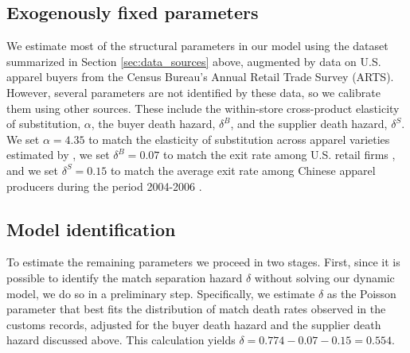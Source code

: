 \documentclass[12pt]{article} \usepackage{amsmath,amssymb,amsthm,geometry,graphicx,setspace,algorithm,algpseudocode,float}
\begin{document}
\subsection{Exogenously fixed parameters}
We estimate most of the structural parameters in our model using the dataset summarized in Section \ref{sec:data_sources} above, augmented by data on U.S. apparel buyers from the Census Bureau's Annual Retail Trade Survey (ARTS). However, several parameters are not identified by these data, so we calibrate them using other sources.  These include the within-store cross-product elasticity of substitution, $\alpha$, the buyer death hazard, $\delta^B$, and the supplier death hazard, $\delta^S$. 
We set $\alpha=4.35$ to match the elasticity of substitution across apparel varieties estimated by \citet{HottmanReddingWeinstein2015},  we set $\delta^B=0.07$ to match the exit rate among U.S. retail firms \citep{JarminKlimekMiranda2009}, and we set $\delta^S=0.15$ to match the average exit rate among Chinese apparel producers during the period 2004-2006 \citep{Zhu2014}.

\subsection{Model identification}
\label{sec:struc_params}
 To estimate the remaining parameters we proceed in two stages. First, since it is possible to identify the match separation hazard $\delta$ without solving our dynamic model, we do so in a preliminary step. Specifically, we estimate $\delta$ as the Poisson parameter that best fits the distribution of match death rates observed in the customs records, adjusted for the buyer death hazard and the supplier death hazard discussed above. This calculation yields $\delta = 0.774 - 0.07 - 0.15 = 0.554$. 
\end{document}
